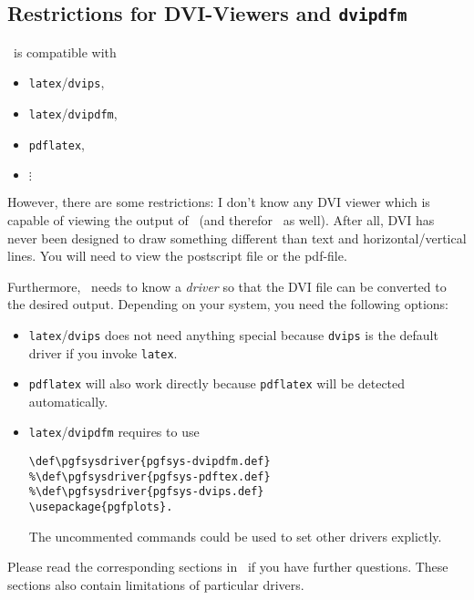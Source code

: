 \subsection{Restrictions for DVI-Viewers and \texttt{dvipdfm}}
\label{sec:drivers}%
\PGF\ is compatible with 
\begin{itemize}
	\item \lstinline!latex!/\lstinline!dvips!,
	\item \lstinline!latex!/\lstinline!dvipdfm!,
	\item \lstinline!pdflatex!,
	\item $\vdots$
\end{itemize}
However, there are some restrictions: I don't know any DVI viewer which is capable of viewing the output of \PGF\ (and therefor \PGFPlots\ as well). After all, DVI has never been designed to draw something different than text and horizontal/vertical lines. You will need to view the postscript file or the pdf-file.

Furthermore, \PGF\ needs to know a \emph{driver} so that the DVI file can be converted to the desired output. Depending on your system, you need the following options:
\begin{itemize}
	\item \lstinline!latex!/\lstinline!dvips! does not need anything special because \lstinline!dvips! is the default driver if you invoke \lstinline!latex!.
	\item \lstinline!pdflatex! will also work directly because \lstinline!pdflatex! will be detected automatically.
	\item \lstinline!latex!/\lstinline!dvipdfm! requires to use
\begin{lstlisting}
\def\pgfsysdriver{pgfsys-dvipdfm.def}
%\def\pgfsysdriver{pgfsys-pdftex.def}
%\def\pgfsysdriver{pgfsys-dvips.def}
\usepackage{pgfplots}.
\end{lstlisting}
	The uncommented commands could be used to set other drivers explictly.
\end{itemize}
Please read the corresponding sections in~\cite[Section 7.2.1 and 7.2.2]{tikz} if you have further questions. These sections also contain limitations of particular drivers.

